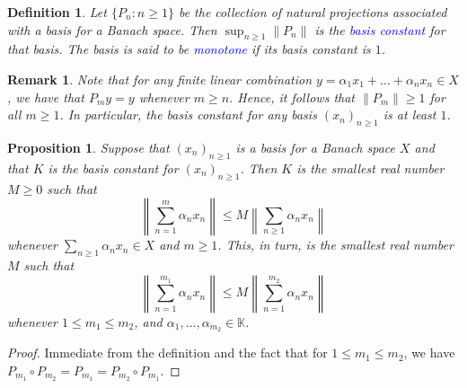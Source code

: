 \documentclass[11pt]{article}
\theoremstyle{thmstyle}
\newtheorem{proposition}[theorem]{Proposition}
\theoremstyle{defstyle}
\newtheorem{definition}[theorem]{Definition}
\newtheorem{remark}[theorem]{Remark}
\newcommand{\R}{\mathbb{R}}
\newcommand{\bbC}{\mathbb{C}}
\newcommand{\K}{\mathbb{K}} %
\newcommand{\define}[1]{\textcolor{blue}{\textit{#1}}}
\renewcommand{\le}{\leqslant}
\renewcommand{\ge}{\geqslant}
\begin{document}
\begin{definition}
	Let $\{P_n\colon n\ge 1\}$ be the collection of natural projections associated with a basis for a Banach space. Then $\displaystyle\sup_{n\ge 1} \|P_n\|$ is the \define{basis constant} for that basis. The basis is said to be \define{monotone} if its basis constant is $1$.
\end{definition}

\begin{remark}
	Note that for any finite linear combination $y = \alpha_1x_1 + \dots + \alpha_n x_n\in X$, we have that $P_m y = y$ whenever $m\ge n$. Hence, it follows that $\|P_m\|\ge 1$ for all $m\ge 1$. In particular, the basis constant for any basis $(x_n)_{n\ge 1}$ is at least $1$.
\end{remark}

\begin{proposition}
	Suppose that $(x_n)_{n\ge 1}$ is a basis for a Banach space $X$ and that $K$ is the basis constant for $(x_n)_{n\ge 1}$. Then $K$ is the smallest real number $M\ge 0$ such that 
	\begin{equation*}
		\left\|\sum_{n = 1}^m \alpha_n x_n\right\|\le M\left\|\sum_{n\ge 1} \alpha_n x_n\right\|
	\end{equation*}
	whenever $\displaystyle\sum_{n\ge 1}\alpha_n x_n\in X$ and $m\ge 1$. This, in turn, is the smallest real number $M$ such that 
	\begin{equation*}
		\left\|\sum_{n = 1}^{m_1}\alpha_n x_n\right\|\le M\left\|\sum_{n = 1}^{m_2} \alpha_n x_n\right\|
	\end{equation*}
	whenever $1\le m_1\le m_2$, and $\alpha_1,\dots,\alpha_{m_2}\in\K$.
\end{proposition}
\begin{proof}
	Immediate from the definition and the fact that for $1\le m_1\le m_2$, we have $P_{m_1}\circ P_{m_2} = P_{m_1} = P_{m_2}\circ P_{m_1}$.
\end{proof}
\end{document}
